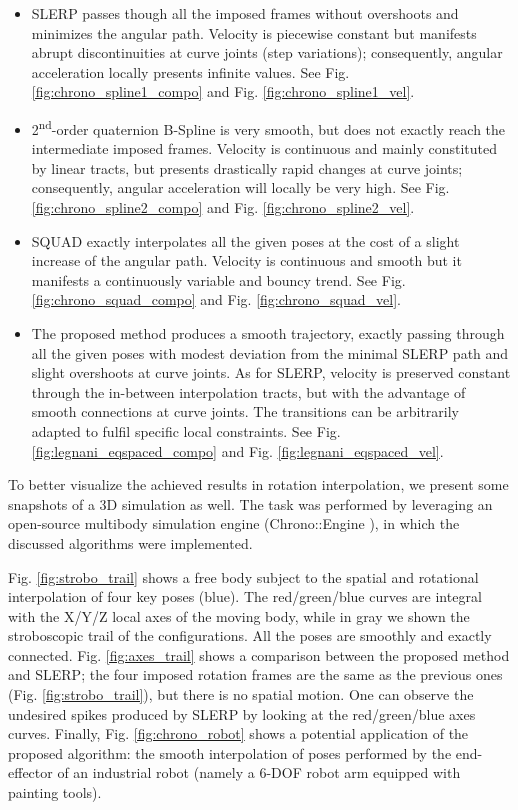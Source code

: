 \begin{itemize}
    \item SLERP passes though all the imposed frames without overshoots and minimizes the angular path. Velocity is piecewise constant but manifests abrupt discontinuities at curve joints (step variations); consequently, angular acceleration locally presents infinite values. See Fig. \ref{fig:chrono_spline1_compo} and Fig. \ref{fig:chrono_spline1_vel}.
    \item 2\textsuperscript{nd}-order quaternion B-Spline is very smooth, but does not exactly reach the intermediate imposed frames. Velocity is continuous and mainly constituted by linear tracts, but presents drastically rapid changes at curve joints; consequently, angular acceleration will locally be very high. See Fig. \ref{fig:chrono_spline2_compo} and Fig. \ref{fig:chrono_spline2_vel}.
    \item SQUAD exactly interpolates all the given poses at the cost of a slight increase of the angular path. Velocity is continuous and smooth but it manifests a continuously variable and bouncy trend. See Fig. \ref{fig:chrono_squad_compo} and Fig. \ref{fig:chrono_squad_vel}.
    \item The proposed method produces a smooth trajectory, exactly passing through all the given poses with modest deviation from the minimal SLERP path and slight overshoots at curve joints. As for SLERP, velocity is preserved constant through the in-between interpolation tracts, but with the advantage of smooth connections at curve joints. The transitions can be arbitrarily adapted to fulfil specific local constraints. See Fig. \ref{fig:legnani_eqspaced_compo} and Fig. \ref{fig:legnani_eqspaced_vel}.
\end{itemize}

To better visualize the achieved results in rotation interpolation, we present some snapshots of a 3D simulation as well. The task was performed by leveraging an open-source multibody simulation engine (Chrono::Engine \cite{tasora2015chrono}), in which the discussed algorithms were implemented. 

Fig. \ref{fig:strobo_trail} shows a free body subject to the spatial and rotational interpolation of four key poses (blue). The red/green/blue curves are integral with the X/Y/Z local axes of the moving body, while in gray we shown the stroboscopic trail of the configurations. All the poses are smoothly and exactly connected. Fig. \ref{fig:axes_trail} shows a comparison between the proposed method and SLERP; the four imposed rotation frames are the same as the previous ones (Fig. \ref{fig:strobo_trail}), but there is no spatial motion. One can observe the undesired spikes produced by SLERP by looking at the red/green/blue axes curves. Finally, Fig. \ref{fig:chrono_robot} shows a potential application of the proposed algorithm: the smooth interpolation of poses performed by the end-effector of an industrial robot (namely a 6-DOF robot arm equipped with painting tools).


